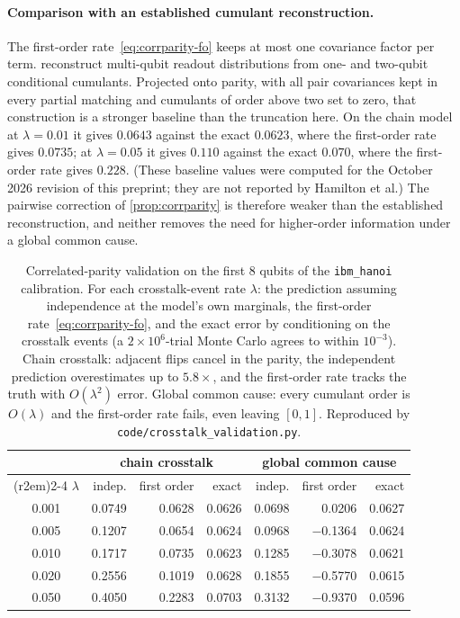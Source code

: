\documentclass[11pt]{article}
\numberwithin{equation}{section}
\theoremstyle{plain}
\theoremstyle{definition}
\theoremstyle{remark}
\begin{document}
\paragraph{Comparison with an established cumulant reconstruction.} The
first-order rate~\eqref{eq:corrparity-fo} keeps at most one covariance factor
per term. \citet{hamilton2020scalable} reconstruct multi-qubit readout
distributions from one- and two-qubit conditional cumulants. Projected onto
parity, with all pair covariances kept in every partial matching and cumulants
of order above two set to zero, that construction is a stronger baseline than
the truncation here. On the chain model at $\lambda=0.01$ it gives $0.0643$
against the exact $0.0623$, where the first-order rate gives $0.0735$; at
$\lambda=0.05$ it gives $0.110$ against the exact $0.070$, where the
first-order rate gives $0.228$. (These baseline values were computed for the
October 2026 revision of this preprint; they are not reported by Hamilton et
al.) The pairwise correction of \cref{prop:corrparity} is therefore weaker
than the established reconstruction, and neither removes the need for
higher-order information under a global common cause.

\begin{table}[t]
\centering
\caption{Correlated-parity validation on the first $8$ qubits of the
\texttt{ibm\_hanoi} calibration. For each crosstalk-event rate $\lambda$: the
prediction assuming independence at the model's own marginals, the first-order
rate~\eqref{eq:corrparity-fo}, and the exact error by conditioning on the
crosstalk events (a $2\times10^6$-trial Monte Carlo agrees to within
$10^{-3}$). Chain crosstalk: adjacent flips cancel in the parity, the
independent prediction overestimates up to $5.8\times$, and the first-order
rate tracks the truth with $O(\lambda^2)$ error. Global common cause: every
cumulant order is $O(\lambda)$ and the first-order rate fails, even leaving
$[0,1]$. Reproduced by \texttt{code/crosstalk\_validation.py}.}
\label{tab:crosstalk}
\small
\begin{tabular}{c rrr @{\hskip 2em} rrr}
\toprule
 & \multicolumn{3}{c}{chain crosstalk} & \multicolumn{3}{c}{global common cause} \\
\cmidrule(r{2em}){2-4} \cmidrule{5-7}
$\lambda$ & indep. & first order & exact & indep. & first order & exact \\
\midrule
0.001 & 0.0749 & 0.0628 & 0.0626 & 0.0698 & \phantom{$-$}0.0206 & 0.0627 \\
0.005 & 0.1207 & 0.0654 & 0.0624 & 0.0968 & $-$0.1364 & 0.0624 \\
0.010 & 0.1717 & 0.0735 & 0.0623 & 0.1285 & $-$0.3078 & 0.0621 \\
0.020 & 0.2556 & 0.1019 & 0.0628 & 0.1855 & $-$0.5770 & 0.0615 \\
0.050 & 0.4050 & 0.2283 & 0.0703 & 0.3132 & $-$0.9370 & 0.0596 \\
\bottomrule
\end{tabular}
\end{table}
\end{document}

